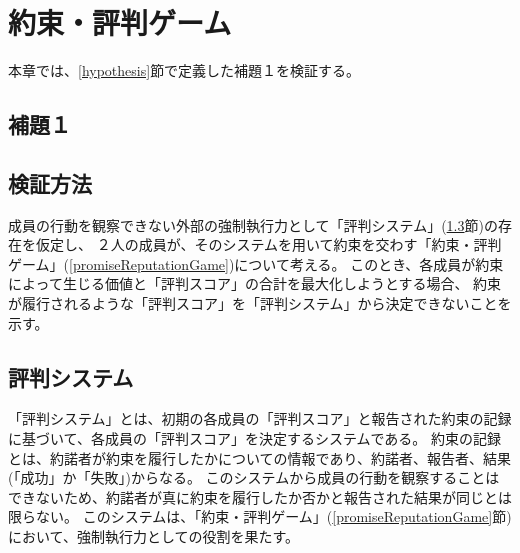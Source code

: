 \chapter{約束・評判ゲーム}
本章では、\ref{hypothesis}節で定義した補題１を検証する。

\section{補題１}
\firstLemma

\section{検証方法}
成員の行動を観察できない外部の強制執行力として「評判システム」(\ref{reputationSystem}節)の存在を仮定し、
２人の成員が、そのシステムを用いて約束を交わす「約束・評判ゲーム」(\ref{promiseReputationGame})について考える。
このとき、各成員が約束によって生じる価値と「評判スコア」の合計を最大化しようとする場合、
約束が履行されるような「評判スコア」を「評判システム」から決定できないことを示す。


\section{評判システム}
\label{reputationSystem}
「評判システム」とは、初期の各成員の「評判スコア」と報告された約束の記録に基づいて、各成員の「評判スコア」を決定するシステムである。
約束の記録とは、約諾者が約束を履行したかについての情報であり、約諾者、報告者、結果(「成功」か「失敗」)からなる。
このシステムから成員の行動を観察することはできないため、約諾者が真に約束を履行したか否かと報告された結果が同じとは限らない。
このシステムは、「約束・評判ゲーム」(\ref{promiseReputationGame}節)において、強制執行力としての役割を果たす。


